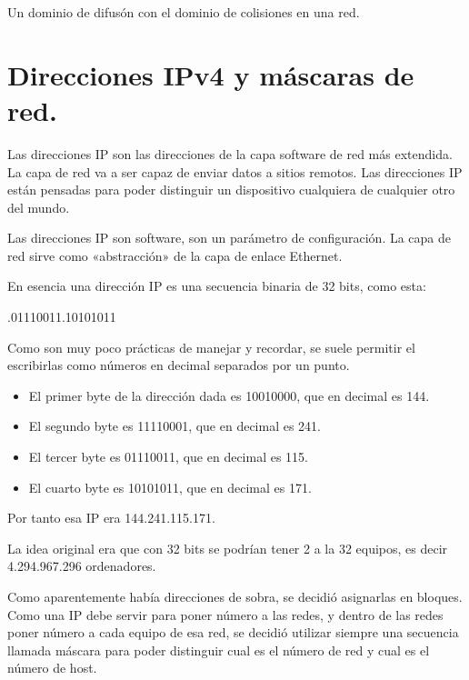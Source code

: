 \documentclass[letterpaper,10pt,spanish]{sphinxmanual}
\begin{document}
\sphinxAtStartPar
Un dominio de difusón  con el dominio de colisiones en una red.


\section{Direcciones IPv4 y máscaras de red.}
\label{\detokenize{t2_integracion_elementos/apuntes_t2:direcciones-ipv4-y-mascaras-de-red}}
\sphinxAtStartPar
Las direcciones IP son las direcciones de la capa software de red más extendida. La capa de red va a ser capaz de enviar datos a sitios remotos. Las direcciones IP están pensadas para poder distinguir un dispositivo cualquiera de cualquier otro del mundo.

\sphinxAtStartPar
Las direcciones IP son software, son un parámetro de configuración. La capa de red sirve como «abstracción» de la capa de enlace Ethernet.

\sphinxAtStartPar
En esencia una dirección IP es una secuencia binaria de 32 bits, como esta:

.01110011.10101011

\sphinxAtStartPar
Como son muy poco prácticas de manejar y recordar, se suele permitir el escribirlas como números en decimal separados por un punto.
\begin{itemize}
\item {} 
\sphinxAtStartPar
El primer byte de la dirección dada es 10010000, que en decimal es 144.

\item {} 
\sphinxAtStartPar
El segundo byte es 11110001, que en decimal es 241.

\item {} 
\sphinxAtStartPar
El tercer byte es 01110011, que en decimal es 115.

\item {} 
\sphinxAtStartPar
El cuarto byte es 10101011, que en decimal es 171.

\end{itemize}

\sphinxAtStartPar
Por tanto esa IP era 144.241.115.171.

\sphinxAtStartPar
La idea original era que con 32 bits se podrían tener 2 a la 32 equipos, es decir 4.294.967.296 ordenadores.

\sphinxAtStartPar
Como aparentemente había direcciones de sobra, se decidió asignarlas en bloques. Como una IP debe servir para poner número a las redes, y dentro de las redes poner número a cada equipo de esa red, se decidió utilizar siempre una secuencia llamada máscara para poder distinguir cual es el número de red y cual es el número de host.
\end{document}

